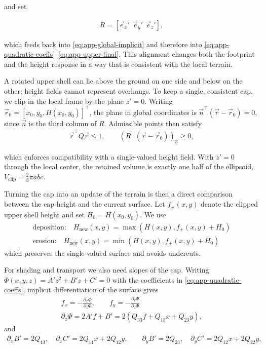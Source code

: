 and set

\begin{align}
    \label{eq:app-rotation-from-normal}
    R=[ \vec e_x'\ \ \vec e_y'\ \ \vec e_z' ],
\end{align}

which feeds back into \cref{eq:app-global-implicit} and therefore into \cref{eq:app-quadratic-coeffs}–\cref{eq:app-upper-final}. This alignment changes both the footprint and the height response in a way that is consistent with the local terrain.

A rotated upper shell can lie above the ground on one side and below on the other; height fields cannot represent overhangs. To keep a single, consistent cap, we clip in the local frame by the plane $z'=0$. Writing $\vec r_0=[x_0,y_0,H(x_0,y_0)]^\top $, the plane in global coordinates is $\vec n^\top (\vec r-\vec r_0)=0$, since $\vec n$ is the third column of $R$. Admissible points then satisfy
\begin{align}
    \vec r^\top Q\vec r \le 1,
    \qquad
    \left(R^\top (\vec r-\vec r_0)\right)_3 \ge 0,
\end{align}

which enforces compatibility with a single-valued height field. With $z'=0$ through the local center, the retained volume is exactly one half of the ellipsoid, $V_{\text{clip}}=\tfrac{2}{3}\pi abc$.

Turning the cap into an update of the terrain is then a direct comparison between the cap height and the current surface. Let $f_{+}(x,y)$ denote the clipped upper shell height and set $H_0=H(x_0,y_0)$. We use
\begin{align}
    \text{deposition:} \quad H_{\text{new}}(x,y)=\max\left(H(x,y), f_{+}(x,y)+H_0\right) \\
    \text{erosion:}\quad H_{\text{new}}(x,y)=\min\left(H(x,y), f_{+}(x,y)+H_0\right)
\end{align}
which preserves the single-valued surface and avoids undercuts.

For shading and transport we also need slopes of the cap. Writing $\Phi(x,y,z)=A'z^2+B'z+C'=0$ with the coefficients in \cref{eq:app-quadratic-coeffs}, implicit differentiation of the surface gives
\begin{align}
    f_x=-\frac{\partial_x\Phi}{\partial_z\Phi},
    \qquad
    f_y=-\frac{\partial_y\Phi}{\partial_z\Phi} \\
    \partial_z\Phi=2A' f + B' = 2\left(Q_{33} f + Q_{13}x + Q_{23}y\right),
\end{align}
and
\begin{align}
    \partial_x B'=2Q_{13},\quad
    \partial_x C'=2Q_{11}x+2Q_{12}y,
    \qquad
    \partial_y B'=2Q_{23},\quad
    \partial_y C'=2Q_{12}x+2Q_{22}y,
\end{align}

